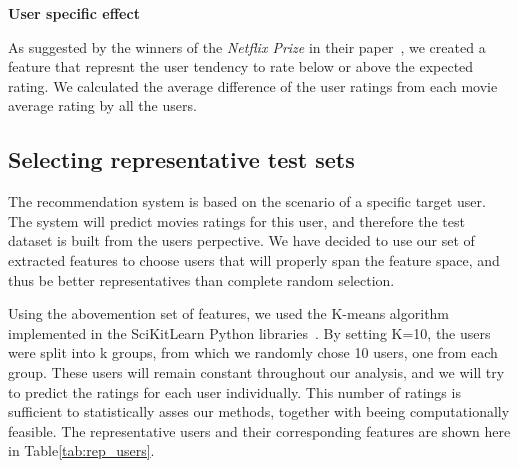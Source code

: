 \textbf{User specific effect}

As suggested by the winners of the \textit{Netflix Prize} in their paper~\cite{bell2007bellkor}, we created a feature that represnt the user tendency to rate below or above the expected rating. We calculated the average difference of the user ratings from each movie average rating by all the users.

\subsection{Selecting representative test sets}
The recommendation system is based on the scenario of a specific target user. The system will predict movies ratings for this user, and therefore the test dataset is built from the users perpective. We have decided to use our set of extracted features to choose users that will properly span the feature space, and thus be better representatives than complete random selection. 

Using the abovemention set of features, we used the K-means algorithm implemented in the SciKitLearn Python libraries~\cite{pedregosa2011scikit}. By setting K=10, the users were split into k groups, from which we randomly chose 10 users, one from each group. These users will remain constant throughout our analysis, and we will try to predict the ratings for each user individually. This number of ratings is sufficient to statistically asses our methods, together with beeing computationally feasible. The representative users and their corresponding features are shown here in Table\ref{tab:rep_users}.

